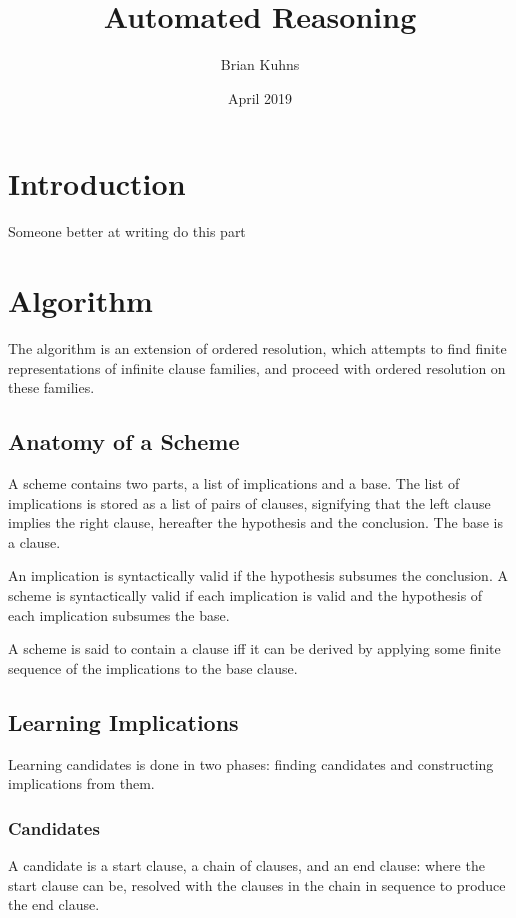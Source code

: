 \documentclass{article}
\title{Automated Reasoning}
\author{Brian Kuhns}
\date{April 2019}
\begin{document}
\maketitle

\section{Introduction}

  Someone better at writing do this part

\section{Algorithm}

The algorithm is an extension of ordered resolution,
which attempts to find finite representations of infinite clause families,
and proceed with ordered resolution on these families.

\subsection{Anatomy of a Scheme}

A scheme contains two parts, a list of implications and a base.
The list of implications is stored as a list of pairs of clauses,
signifying that the left clause implies the right clause, hereafter the hypothesis and the conclusion.
The base is a clause.

An implication is syntactically valid if the hypothesis subsumes the conclusion.
A scheme is syntactically valid if each implication is valid and
the hypothesis of each implication subsumes the base.

A scheme is said to contain a clause iff it can be derived by applying some finite sequence of the 
implications to the base clause.

\subsection{Learning Implications}

Learning candidates is done in two phases: finding candidates and constructing implications from them.
 
\subsubsection{Candidates}

A candidate is a start clause, a chain of clauses, and an end clause:
where the start clause can be, resolved with the clauses in the chain in sequence to produce the end clause.
\end{document}
